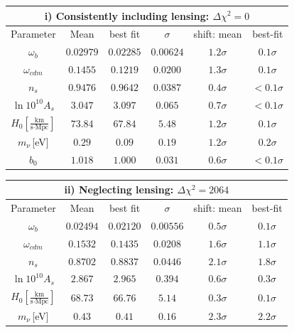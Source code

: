\begin{table}[!t]
  \centering
  \begin{tabular}{@{}cccccc}
    \hline
    \multicolumn{6}{c}{i) Consistently including lensing: $\Delta \chi^2 = 0$} \\
    \hline
    Parameter & Mean & best fit & $\sigma$ &\hspace{-0.52cm} shift: mean & best-fit \\
    \hline
    $\omega_b$ & $0.02979$ & $0.02285 $ &$0.00624 $ &  \quad$1.2\sigma$ & $ 0.1\sigma$ \\
    $\omega_{cdm}$ & $0.1455 $ & $0.1219 $ & \quad$0.0200 $ &  \quad$1.3\sigma$ & $0.1\sigma$ \\
    $n_s$      & $0.9476 $ & $0.9642 $ & $0.0387 $ &  \quad$0.4\sigma$ & $ <0.1\sigma$ \\
    $\ln10^{10}A_s$ & $3.047 $ & $3.097$ & $0.065 $ &  \quad$0.7\sigma$ & $ <0.1\sigma$ \\
    $H_0\left[\frac{\text{km}}{\text{s}\cdot\text{Mpc}}\right]$      & $73.84$ & $67.84$ & $5.48$ &  \quad$1.2\sigma$ & $ 0.1\sigma$ \\
    $m_{\nu}$\,[eV]  & $0.29$ & $0.09$ & $0.19$ & \quad $ 1.2\sigma$ & $ 0.2\sigma$ \\
    $b_0$ & $1.018$ & $1.000$ & $0.031$ & \quad$0.6\sigma$ & $<0.1\sigma$ \\
  \end{tabular}
  \begin{tabular}{@{}cccccc}
    \hline
    \multicolumn{6}{c}{ii) Neglecting lensing: $\Delta \chi^2 = 2064$} \\
    \hline
    Parameter & Mean & best fit & $\sigma$ & \hspace{-0.52cm} shift: mean & best-fit \\
    \hline
    $\omega_b$ & $0.02494$ & $0.02120 $ & $0.00556 $ &  \quad$0.5\sigma$ & $0.1\sigma$ \\
    $\omega_{cdm}$ & $0.1532$ & $0.1435$ & $0.0208$ &  \quad$1.6\sigma$ & $1.1\sigma$ \\
    $n_s$      & $0.8702$ & $0.8837$ & $0.0446$ &  \quad$2.1\sigma$ & $1.8\sigma$ \\
    $\ln10^{10}A_s$ & $ 2.867 $ & $2.965 $ & $ 0.394 $ &  \quad$0.6\sigma$ & $0.3\sigma$ \\
    $H_0\left[\frac{\text{km}}{\text{s}\cdot\text{Mpc}}\right]$      & $68.73$ & $66.76$ & $5.14$ &  \quad$0.3\sigma$ & $0.1\sigma$ \\
    $m_{\nu}$\,[eV]  & $0.43$ & $0.41$ & $0.16$ &  \quad$2.3\sigma$ & $2.2\sigma$ \\

\end{tabular}
\end{table}
